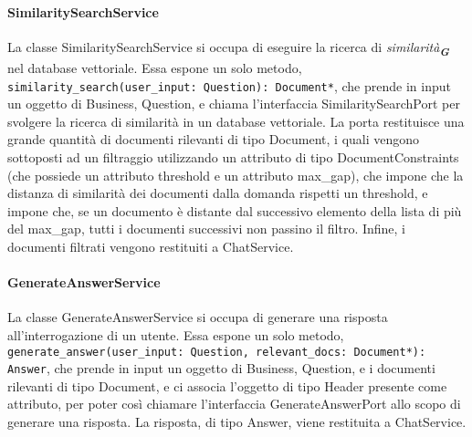 \paragraph{SimilaritySearchService}
\label{sec:similarity_search_service}
La classe SimilaritySearchService si occupa di eseguire la ricerca di \emph{similarità}\textsubscript{\textbf{\textit{G}}} nel database vettoriale. Essa espone un solo metodo, \texttt{similarity\_search(user\_input: Question): Document*}, che prende in input un oggetto di Business, Question, e chiama l'interfaccia SimilaritySearchPort per svolgere la ricerca di similarità in un database vettoriale. La porta restituisce una grande quantità di documenti rilevanti di tipo Document, i quali vengono sottoposti ad un filtraggio utilizzando un attributo di tipo DocumentConstraints (che possiede un attributo threshold e un attributo max\_gap), che impone che la distanza di similarità dei documenti dalla domanda rispetti un threshold, e impone che, se un documento è distante dal successivo elemento della lista di più del max\_gap, tutti i documenti successivi non passino il filtro. Infine, i documenti filtrati vengono restituiti a ChatService.

\paragraph{GenerateAnswerService}
\label{sec:generate_answer_service}
La classe GenerateAnswerService si occupa di generare una risposta all'interrogazione di un utente. Essa espone un solo metodo, \texttt{generate\_answer(user\_input: Question, relevant\_docs: Document*): Answer}, che prende in input un oggetto di Business, Question, e i documenti rilevanti di tipo Document, e ci associa l'oggetto di tipo Header presente come attributo, per poter così chiamare l'interfaccia GenerateAnswerPort allo scopo di generare una risposta. La risposta, di tipo Answer, viene restituita a ChatService.

